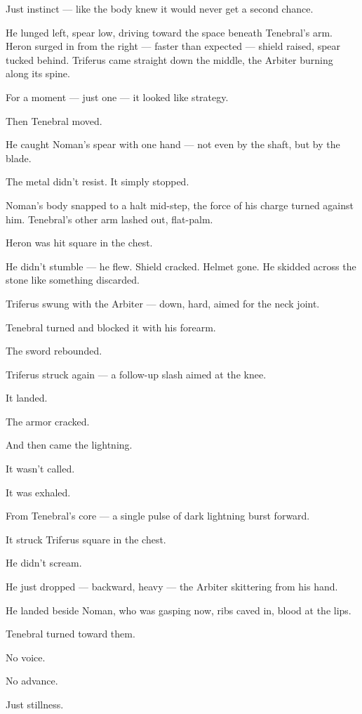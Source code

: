 \documentclass[9pt]{article}
\begin{document}
Just instinct — like the body knew it would never get a second chance.

He lunged left, spear low, driving toward the space beneath Tenebral’s arm. Heron surged in from the right — faster than expected — shield raised, spear tucked behind. Triferus came straight down the middle, the Arbiter burning along its spine.

For a moment — just one — it looked like strategy.

Then Tenebral moved.

\bigskip

He caught Noman’s spear with one hand — not even by the shaft, but by the blade.

The metal didn’t resist. It simply stopped.

Noman’s body snapped to a halt mid-step, the force of his charge turned against him. Tenebral’s other arm lashed out, flat-palm.

Heron was hit square in the chest.

He didn’t stumble — he flew. Shield cracked. Helmet gone. He skidded across the stone like something discarded.

Triferus swung with the Arbiter — down, hard, aimed for the neck joint.

Tenebral turned and blocked it with his forearm.

The sword rebounded.

Triferus struck again — a follow-up slash aimed at the knee.

It landed.

The armor cracked.

And then came the lightning.

\bigskip

It wasn’t called.

It was exhaled.

From Tenebral’s core — a single pulse of dark lightning burst forward.

It struck Triferus square in the chest.

He didn’t scream.

He just dropped — backward, heavy — the Arbiter skittering from his hand.

He landed beside Noman, who was gasping now, ribs caved in, blood at the lips.

Tenebral turned toward them.

No voice.

No advance.

Just stillness.
\end{document}
